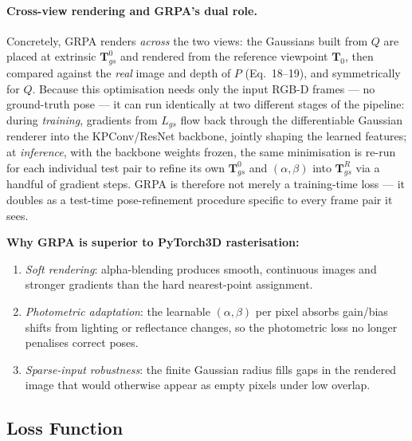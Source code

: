 \documentclass[11pt,a4paper]{article}
\begin{document}
\paragraph{Cross-view rendering and GRPA's dual role.} Concretely, GRPA renders
\emph{across} the two views: the Gaussians built from $Q$ are placed at extrinsic
$\mathbf{T}_{gs}^0$ and rendered from the reference viewpoint $\mathbf{T}_0$, then
compared against the \emph{real} image and depth of $P$ (Eq.~18--19), and symmetrically
for $Q$. Because this optimisation needs only the input RGB-D frames — no ground-truth
pose — it can run identically at two different stages of the pipeline: during
\emph{training}, gradients from $L_{gs}$ flow back through the differentiable Gaussian
renderer into the KPConv/ResNet backbone, jointly shaping the learned features; at
\emph{inference}, with the backbone weights frozen, the same minimisation is re-run for
each individual test pair to refine its own $\mathbf{T}_{gs}^0$ and $(\alpha,\beta)$ into
$\mathbf{T}_{gs}^R$ via a handful of gradient steps. GRPA is therefore not merely a
training-time loss — it doubles as a test-time pose-refinement procedure specific to
every frame pair it sees.

\textbf{Why GRPA is superior to PyTorch3D rasterisation:}
\begin{enumerate}[noitemsep]
  \item \emph{Soft rendering}: alpha-blending produces smooth, continuous images and
    stronger gradients than the hard nearest-point assignment.
  \item \emph{Photometric adaptation}: the learnable $(\alpha, \beta)$ per pixel absorbs
    gain/bias shifts from lighting or reflectance changes, so the photometric loss no
    longer penalises correct poses.
  \item \emph{Sparse-input robustness}: the finite Gaussian radius fills gaps in the
    rendered image that would otherwise appear as empty pixels under low overlap.
\end{enumerate}

\subsection{Loss Function}
\label{sec:loss}
\end{document}
